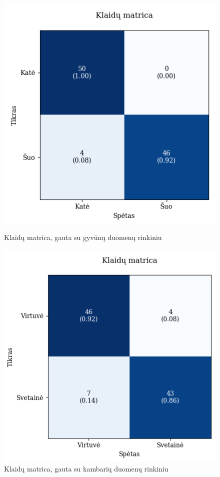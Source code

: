 \documentclass{VUMIFPSbakalaurinis}
\begin{document}
\begin{figure}[!htbp]
    \centering
    \begin{minipage}[b]{0.48\textwidth}
      \includegraphics[width=\textwidth]{img/GrapthsNEW/Large/animal/20/KM_DC_L_20.png}
      \caption{Klaidų matrica, gauta su gyvūnų duomenų rinkiniu}
    \end{minipage}
    \hspace{2mm}
    \begin{minipage}[b]{0.48\textwidth}
      \includegraphics[width=\textwidth]{img/GrapthsNEW/Large/room/20/KM_R_L_20.png}
      \caption{Klaidų matrica, gauta su kambarių duomenų rinkiniu}
    \end{minipage}
\end{figure}
\end{document}
